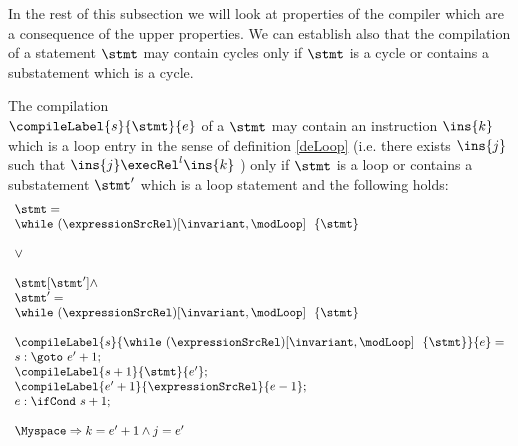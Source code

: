 In the rest of this subsection we will look at properties of the compiler which are a consequence of the upper properties.
We can establish also that the compilation of a statement $\stmt$ may  contain  cycles only if $\stmt$ is a cycle or contains
a substatement which is a cycle. 
\begin{compProp4}\label{compile:prop:compProp4}  %
The compilation \\ $\compileLabel{s}{\stmt}{e}$ of a $\stmt$ may contain an instruction $\ins{k}$ which is a loop entry in the sense of definition 
\ref{deLoop} (i.e. there exists $\ins{j}$ such that $\ins{j} \execRel^{l} \ins{k}$ ) only if  $\stmt$ is a loop or contains 
 a substatement $\stmt'$ which is a loop statement and the following holds:
  $$\begin{array}{l}
                        \stmt = \\
             
	                \while \ (\expressionSrcRel) \lbrack \invariant, \modLoop \rbrack \ \do \ \{ \stmt \} \\ \\ 
			\vee \\\\

                        \stmt[\stmt'] \wedge \\
			\stmt' = \\
             
	                \while \ (\expressionSrcRel) \lbrack \invariant, \modLoop \rbrack \ \do \ \{ \stmt \} \\ \\ 

                        \compileLabel{s}{   \while \ (\expressionSrcRel) \lbrack \invariant, \modLoop \rbrack \ \do \ \{ \stmt \}   }{e} = \\
			s: \goto \ e' + 1; \\
	                \compileLabel{s +  1}{\stmt}{e'}; \\
			 \compileLabel{e' +  1}{\expressionSrcRel}{e  -1 };\\
			 e: \ifCond \ s +  1; \\  \\
                        \Myspace \Rightarrow k = e' +1 \wedge j = e'  
                
	           \end{array} 
               $$ 
	   
              
             

\end{compProp4}
 
